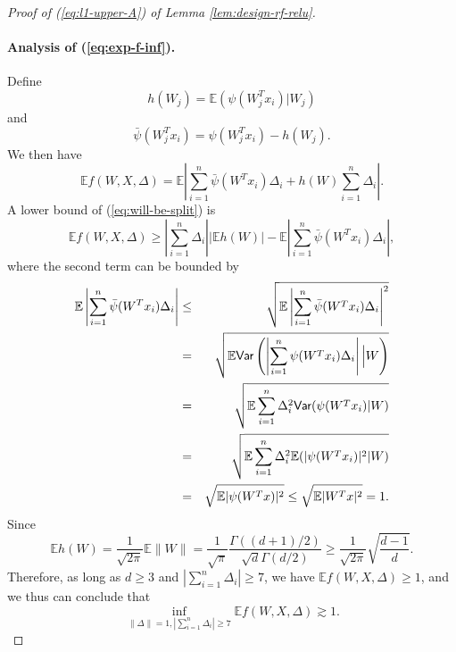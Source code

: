 \begin{proof}[Proof of (\ref{eq:l1-upper-A}) of Lemma \ref{lem:design-rf-relu}]
\paragraph{Analysis of (\ref{eq:exp-f-inf}).} Define
$$h(W_j)=\mathbb{E}(\psi(W_j^Tx_i)|W_j)$$ and $$\bar{\psi}(W_j^Tx_i)=\psi(W_j^Tx_i)-h(W_j).$$ We then have
\begin{equation}
\mathbb{E}f(W,X,\Delta)=\mathbb{E}\left|\sum_{i=1}^n\bar{\psi}(W^Tx_i)\Delta_i+h(W)\sum_{i=1}^n\Delta_i\right|. \label{eq:will-be-split}
\end{equation}
A lower bound of (\ref{eq:will-be-split}) is
$$\mathbb{E}f(W,X,\Delta)\geq \left|\sum_{i=1}^n\Delta_i\right|\left|\mathbb{E}h(W)\right|-\mathbb{E}\left|\sum_{i=1}^n\bar{\psi}(W^Tx_i)\Delta_i\right|,$$
where the second term can be bounded by
\begin{eqnarray*}
\mathbb{E}\left|\sum_{i=1}^n\bar{\psi}(W^Tx_i)\Delta_i\right| &\leq& \sqrt{\mathbb{E}\left|\sum_{i=1}^n\bar{\psi}(W^Tx_i)\Delta_i\right|^2} \\
&=& \sqrt{\mathbb{E}\Var\left(\left|\sum_{i=1}^n\psi(W^Tx_i)\Delta_i\right|\Big|W\right)} \\
&=& \sqrt{\mathbb{E}\sum_{i=1}^n\Delta_i^2\Var(\psi(W^Tx_i)|W)} \\
&=& \sqrt{\mathbb{E}\sum_{i=1}^n\Delta_i^2\mathbb{E}(|\psi(W^Tx_i)|^2|W)} \\
&=& \sqrt{\mathbb{E}|\psi(W^Tx)|^2} \leq \sqrt{\mathbb{E}|W^Tx|^2} = 1.
\end{eqnarray*}
Since
$$\mathbb{E}h(W)=\frac{1}{\sqrt{2\pi}}\mathbb{E}\|W\|=\frac{1}{\sqrt{\pi}}\frac{\Gamma((d+1)/2)}{\sqrt{d}\Gamma(d/2)}\geq \frac{1}{\sqrt{2\pi}}\sqrt{\frac{d-1}{d}}.$$
Therefore, as long as $d\geq 3$ and $\left|\sum_{i=1}^n\Delta_i\right|\geq 7$, we have $\mathbb{E}f(W,X,\Delta)\geq 1$, and we thus can conclude that
\begin{equation}
\inf_{\|\Delta\|=1,|\sum_{i=1}^n\Delta_i|\geq 7}\mathbb{E}f(W,X,\Delta) \gtrsim 1.\label{eq:l1-1-1}
\end{equation}


\end{proof}
